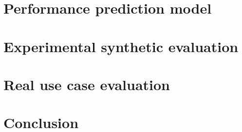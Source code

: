 \documentclass[5p]{elsarticle}
\begin{document}
\section{Performance prediction model}
\label{sec:perf_model}


\section{Experimental synthetic evaluation}
\label{sec:evaluations}


\section{Real use case evaluation}
\label{sec:use-cases}


\section{Conclusion}
\label{sec:conc}






%  

\end{document}
